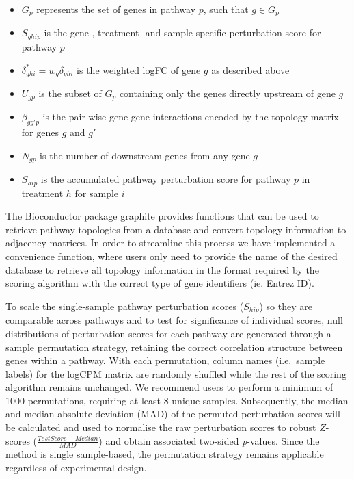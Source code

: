 \documentclass[9pt,a4paper,]{extarticle}
\begin{document}
\begin{itemize}
\item
  \(G_p\) represents the set of genes in pathway \(p\), such that \(g \in G_p\)
\item
  \(S_{ghip}\) is the gene-, treatment- and sample-specific perturbation score for pathway \(p\)
\item
  \(\delta_{ghi}^* = w_g\delta_{ghi}\) is the weighted logFC of gene \(g\) as described above
\item
  \(U_{gp}\) is the subset of \(G_p\) containing only the genes directly upstream of gene \(g\)
\item
  \(\beta_{gg'p}\) is the pair-wise gene-gene interactions\citep{Tarca2009} encoded by the topology matrix for genes \(g\) and \(g'\)
\item
  \(N_{gp}\) is the number of downstream genes from any gene \(g\)
\item
  \(S_{hip}\) is the accumulated pathway perturbation score for pathway \(p\) in treatment \(h\) for sample \(i\)
\end{itemize}

The Bioconductor package graphite\citep{Sales2012} provides functions that can be used to retrieve pathway topologies from a database and convert topology information to adjacency matrices.
In order to streamline this process we have implemented a convenience function, where users only need to provide the name of the desired database to retrieve all topology information in the format required by the scoring algorithm with the correct type of gene identifiers (ie. Entrez ID).

To scale the single-sample pathway perturbation scores (\(S_{hip}\)) so they are comparable across pathways and to test for significance of individual scores, null distributions of perturbation scores for each pathway are generated through a sample permutation strategy, retaining the correct correlation structure between genes within a pathway.
With each permutation, column names (i.e.~sample labels) for the logCPM matrix are randomly shuffled while the rest of the scoring algorithm remains unchanged.
We recommend users to perform a minimum of 1000 permutations, requiring at least 8 unique samples.
Subsequently, the median and median absolute deviation (MAD) of the permuted perturbation scores will be calculated and used to normalise the raw perturbation scores to robust \(Z\)-scores (\(\frac{Test Score - Median}{MAD}\)) and obtain associated two-sided \emph{p}-values.
Since the method is single sample-based, the permutation strategy remains applicable regardless of experimental design.
\end{document}
